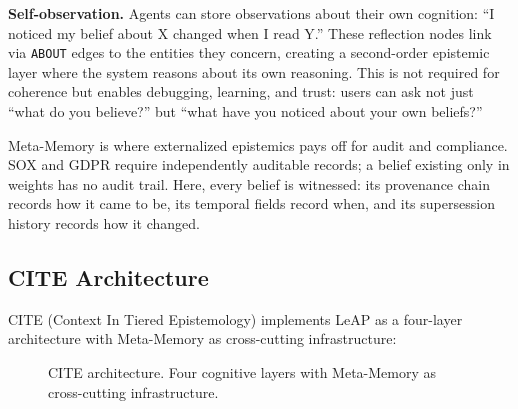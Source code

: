 \documentclass[11pt,letterpaper]{article}
\begin{document}
\textbf{Self-observation.} Agents can store observations about their own cognition: ``I noticed my belief about X changed when I read Y.'' These reflection nodes link via \texttt{ABOUT} edges to the entities they concern, creating a second-order epistemic layer where the system reasons about its own reasoning. This is not required for coherence but enables debugging, learning, and trust: users can ask not just ``what do you believe?'' but ``what have you noticed about your own beliefs?''

Meta-Memory is where externalized epistemics pays off for audit and compliance. SOX and GDPR require independently auditable records; a belief existing only in weights has no audit trail. Here, every belief is witnessed: its provenance chain records how it came to be, its temporal fields record when, and its supersession history records how it changed.

\subsection{CITE Architecture}

CITE (Context In Tiered Epistemology) implements LeAP as a four-layer architecture with Meta-Memory as cross-cutting infrastructure:

\begin{figure}[H]
\centering
{}
\caption{CITE architecture. Four cognitive layers with Meta-Memory as cross-cutting infrastructure.}
\label{fig:layers}
\end{figure}
\end{document}
